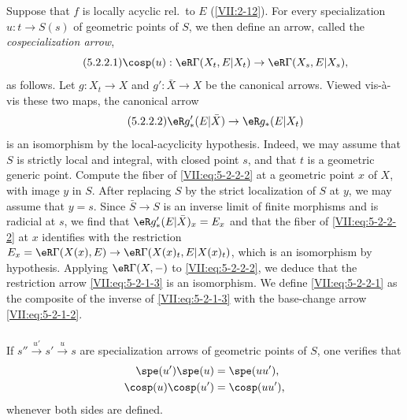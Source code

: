 \documentclass[oneside]{book}
\begin{document}
\subsubsection{}\label{VII:5-2-2}

Suppose that $f$ is locally acyclic rel.\ to $E$ (\ref{VII:2-12}). For
every specialization $u:t\to S(s)$ of geometric points of $S$, we then define
an arrow, called the \emph{cospecialization arrow},
\begin{equation*}\tag{5.2.2.1}\label{VII:eq:5-2-2-1}
  \cosp(u):\eR\Gamma(X_t,E|X_t) \to \eR\Gamma(X_s,E|X_s) \text{,} 
\end{equation*}
as follows. Let $g:X_t\to X$ and $g':\bar X\to X$ be the canonical arrows.
Viewed vis-\`a-vis these two maps, the canonical arrow
\begin{equation*}\tag{5.2.2.2}\label{VII:eq:5-2-2-2}
  \eR g'_\ast(E|\bar X)\to \eR g_\ast(E|X_t) 
\end{equation*}
is an isomorphism by the local-acyclicity hypothesis. Indeed, we may assume
that $S$ is strictly local and integral, with closed point $s$, and that $t$
is a geometric generic point. Compute the fiber of
\eqref{VII:eq:5-2-2-2} at a geometric point $x$ of $X$, with image $y$ in
$S$. After replacing $S$ by the strict localization of $S$ at $y$, we may
assume that $y=s$. Since $\bar S\to S$ is an inverse limit of finite
morphisms and is radicial at $s$, we find that
$\eR g'_\ast(E|\bar X)_x = E_x$ and that the fiber of
\eqref{VII:eq:5-2-2-2} at $x$ identifies with the restriction
$E_x=\eR\Gamma(X(x),E)\to \eR\Gamma(X(x)_t,E|X(x)_t)$, which is an
isomorphism by hypothesis. Applying $\eR\Gamma(X,-)$ to
\eqref{VII:eq:5-2-2-2}, we deduce that the restriction arrow
\eqref{VII:eq:5-2-1-3} is an isomorphism. We define
\eqref{VII:eq:5-2-2-1} as the composite of the inverse of
\eqref{VII:eq:5-2-1-3} with the base-change arrow
\eqref{VII:eq:5-2-1-2}.






\subsubsection{}\label{VII:5-2-3}

If $s'' \xrightarrow{u'} s' \xrightarrow u s$ are specialization arrows of
geometric points of $S$, one verifies that
\begin{align*}
  \spe(u')\spe(u) &= \spe(u u') \text{,} \\
  \cosp(u) \cosp(u') &= \cosp(u u') \text{,} 
\end{align*}
whenever both sides are defined.
\end{document}
